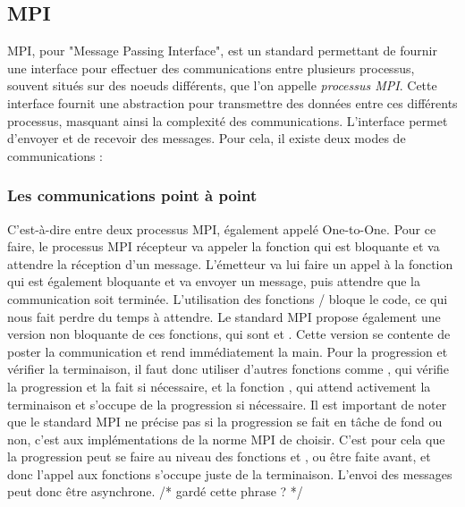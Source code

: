 
\subsection{MPI}

MPI, pour "Message Passing Interface", est un standard permettant de fournir une interface pour effectuer des communications entre plusieurs processus, souvent situés sur des noeuds différents, que l'on appelle \emph{processus MPI}.
Cette interface fournit une abstraction pour transmettre des données entre ces différents processus, masquant ainsi la complexité des communications.
L'interface permet d'envoyer et de recevoir des messages. Pour cela, il existe deux modes de communications :

\subsubsection{Les communications point à point}

C'est-à-dire entre deux processus MPI, également appelé One-to-One.
Pour ce faire, le processus MPI récepteur va appeler la fonction  qui est bloquante et va attendre la réception d'un message.
L'émetteur va lui faire un appel à la fonction  qui est également bloquante et va envoyer un message, puis attendre que la communication soit terminée.
L'utilisation des fonctions  /  bloque le code, ce qui nous fait perdre du temps à attendre.
Le standard MPI propose également une version non bloquante de ces fonctions, qui sont  et .
Cette version se contente de poster la communication et rend immédiatement la main.
Pour la progression et vérifier la terminaison, il faut donc utiliser d'autres fonctions comme , qui vérifie la progression et la fait si nécessaire, et la fonction , qui attend activement la terminaison et s'occupe de la progression si nécessaire.
Il est important de noter que le standard MPI ne précise pas si la progression se fait en tâche de fond ou non, c'est aux implémentations de la norme MPI de choisir.
C'est pour cela que la progression peut se faire au niveau des fonctions  et , ou être faite avant, et donc l'appel aux fonctions s'occupe juste de la terminaison.
L'envoi des messages peut donc être asynchrone. /* gardé cette phrase ? */

